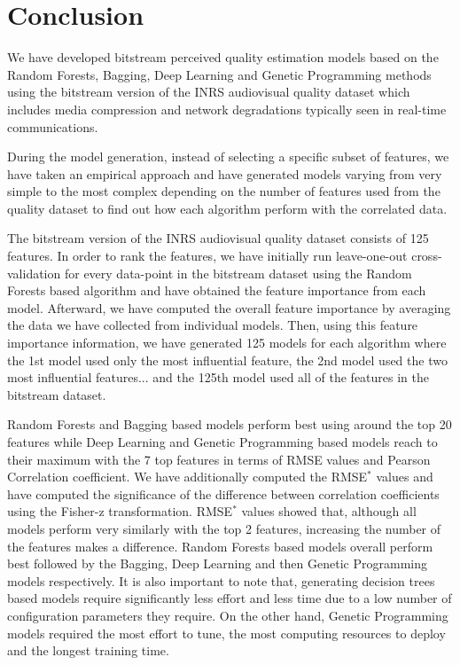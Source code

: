 \documentclass[journal]{IEEEtran}
\begin{document}
\section{Conclusion}
\label{sec:conclusion}

We have developed bitstream perceived quality estimation models based on the Random Forests, Bagging, Deep Learning and Genetic Programming methods using the bitstream version of the INRS audiovisual quality dataset which includes media compression and network degradations typically seen in real-time communications.

During the model generation, instead of selecting a specific subset of features, we have taken an empirical approach and have generated models varying from very simple to the most complex depending on the number of features used from the quality dataset to find out how each algorithm perform with the correlated data. 

The bitstream version of the INRS audiovisual quality dataset consists of 125 features. In order to rank the features, we have initially run leave-one-out cross-validation for every data-point in the bitstream dataset using the Random Forests based algorithm and have obtained the feature importance from each model. Afterward, we have computed the overall feature importance by averaging the data we have collected from individual models. Then, using this feature importance information, we have generated 125 models for each algorithm where the 1st model used only the most influential feature, the 2nd model used the two most influential features... and the 125th model used all of the features in the bitstream dataset.

Random Forests and Bagging based models perform best using around the top 20 features while Deep Learning and Genetic Programming based models reach to their maximum with the 7 top features in terms of RMSE values and Pearson Correlation coefficient. We have additionally computed the RMSE$^*$ values and have computed the significance of the difference between correlation coefficients using the Fisher-z transformation. RMSE$^*$ values showed that, although all models perform very similarly with the top 2 features, increasing the number of the features makes a difference. Random Forests based models overall perform best followed by the Bagging, Deep Learning and then Genetic Programming models respectively. It is also important to note that, generating decision trees based models require significantly less effort and less time due to a low number of configuration parameters they require. On the other hand, Genetic Programming models required the most effort to tune, the most computing resources to deploy and the longest training time. 
\end{document}
